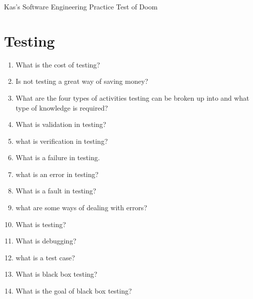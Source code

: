 \documentclass[10pt]{article}
\begin{document}
\begin{center}
    \huge
    Kas's Software Engineering Practice Test of Doom\\

\end{center}
\normalsize

\section{Testing}

\begin{enumerate}
    \item What is the cost of testing?\\

    \item Is not testing a great way of saving money?\\

    \item What are the four types of activities testing can be broken up into and what type of knowledge is required?\\

    \item What is validation in testing?\\

    \item what is verification in testing?\\

    \item What is a failure in testing.\\

    \item what is an error in testing?\\

    \item What is a fault in testing?\\


    \item what are some ways of dealing with errors?

    \item What is testing?

    \item What is debugging?

    \item what is a test case?

    \item What is black box testing?\\
    \item What is the goal of black box testing?\\


\end{enumerate}
\end{document}
